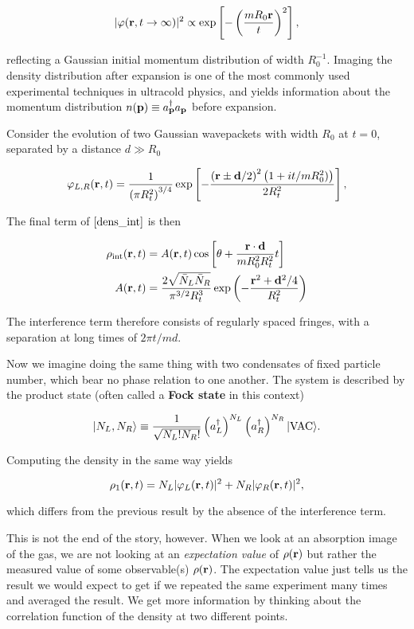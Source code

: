 \[
        |\varphi(\mathbf{r},t\to\infty)|^{2}\propto \exp\left[-\left(\frac{m R_{0}\mathbf{r}}{ t}\right)^{2}\right],
    \label{2nd_quant_TimeOfFlight}
\]

reflecting a Gaussian initial momentum distribution of width
\(R_0^{-1}\). Imaging the density distribution after expansion is one of
the most commonly used experimental techniques in ultracold physics, and
yields information about the momentum distribution
\(n(\bp)\equiv \adop_{\bp}\aop_{\bp}\) before expansion.

Consider the evolution of two Gaussian wavepackets with width \(R_0\) at
\(t=0\), separated by a distance \(d\gg R_0\)

\[
    \varphi_{L,R}(\mathbf{r},t)=\frac{1}{\left(\pi R_t^{2}\right)^{3/4}}\exp\left[-\frac{\left(\mathbf{r}\pm\mathbf{d}/2\right)^2\left(1+i t/m
    R_0^2)\right)}{2R_t^2}\right],
\]

The final term of \(\eqref{dens_int}\) is then

\[
\begin{align}
    \rho_{\mathrm{int}}(\mathbf{r},t)&=A(\mathbf{r},t)\cos\left[\theta+\frac{\mathbf{r}
    \cdot\mathbf{d}}{mR_0^2R_t^2}t\right]\nonumber\\
    A(\mathbf{r},t)&=\frac{2\sqrt{\bar N_L\bar N_R}}{\pi^{3/2}R_t^3}\exp\left(-\frac{\mathbf{r}^2+\mathbf{d}^2/4}{R_t^2}\right)
\label{int_term}
\end{align}
\]

The interference term therefore consists of regularly spaced fringes,
with a separation at long times of \(2\pi t/md\).

Now we imagine doing the same thing with two condensates of fixed
particle number, which bear no phase relation to one another. The system
is described by the product state (often called a \textbf{Fock state} in
this context)

\[
    \lvert{N_L,N_R}\rangle\equiv\frac{1}{\sqrt{N_L! N_R!}}\left(a^\dagger_L\right)^{N_L}\left(a^\dagger_R\right)^{N_R}\lvert{\text{VAC}}\rangle.
\]

Computing the density in the same way yields

\[
    \rho_1(\mathbf{r},t)=N_L|\varphi_L(\mathbf{r},t)|^2+N_R|\varphi_R(\mathbf{r},t)|^2,
\label{dens_fock}  
\]

which differs from the previous result by the absence of the
interference term.

This is not the end of the story, however. When we look at an absorption
image of the gas, we are not looking at an \emph{expectation value} of
\(\rho(\mathbf{r})\) but rather the measured value of some observable(s)
\(\rho(\mathbf{r})\). The expectation value just tells us the result we would
expect to get if we repeated the same experiment many times and averaged
the result. We get more information by thinking about the correlation
function of the density at two different points.

